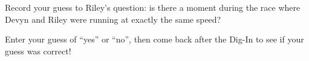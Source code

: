\documentclass{ximera}
\begin{document}
\begin{problem}
  Record your guess to Riley's question: is there a moment during the race where Devyn and Riley were running at exactly the same speed?
  \begin{freeResponse}
  	Enter your guess of ``yes'' or ``no'', then come back after the Dig-In to see if your guess was correct!
  \end{freeResponse}
\end{problem}

%
\end{document}
